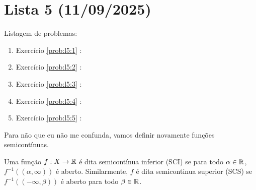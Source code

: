 \section{Lista 5 (11/09/2025)}

Listagem de problemas:
\begin{enumerate}
    \item Exercício \ref{prob:l5:1} : \checkmark
    \item Exercício \ref{prob:l5:2} : \Frowny
    \item Exercício \ref{prob:l5:3} : \Frowny
    \item Exercício \ref{prob:l5:4} : \Frowny
    \item Exercício \ref{prob:l5:5} : \Frowny
\end{enumerate}

\begin{problem}
    \label{prob:l5:1}
\end{problem}
Para não que eu não me confunda, vamos definir novamente funções semicontínuas.
\begin{definition}
    Uma função $f: X \rightarrow \mathbb{R}$ é dita semicontínua inferior (SCI) se para todo $\alpha \in \mathbb{R}$,
    $f^{-1}( (\alpha, \infty) )$ é aberto. Similarmente, $f$ é dita semicontinua superior (SCS)
    se $f^{-1}((-\infty, \beta))$ é aberto para todo $\beta \in \mathbb{R}$.
\end{definition}

